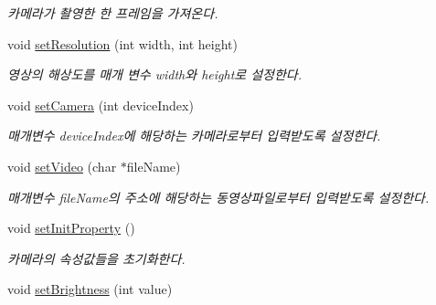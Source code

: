 \begin{DoxyCompactItemize}
\begin{DoxyCompactList}\small\item\em 카메라가 촬영한 한 프레임을 가져온다. \end{DoxyCompactList}\item 
\hypertarget{class_fk_camera_a10bba67c6f4c2d9d9fd75c1977732f93}{}void \hyperlink{class_fk_camera_a10bba67c6f4c2d9d9fd75c1977732f93}{set\+Resolution} (int width, int height)\label{class_fk_camera_a10bba67c6f4c2d9d9fd75c1977732f93}

\begin{DoxyCompactList}\small\item\em 영상의 해상도를 매개 변수 width와 height로 설정한다. \end{DoxyCompactList}\item 
\hypertarget{class_fk_camera_abca0564ec0ab97fe6b34fd76973031cf}{}void \hyperlink{class_fk_camera_abca0564ec0ab97fe6b34fd76973031cf}{set\+Camera} (int device\+Index)\label{class_fk_camera_abca0564ec0ab97fe6b34fd76973031cf}

\begin{DoxyCompactList}\small\item\em 매개변수 device\+Index에 해당하는 카메라로부터 입력받도록 설정한다. \end{DoxyCompactList}\item 
\hypertarget{class_fk_camera_ab1b250db342edba63b7a59d0ab337f99}{}void \hyperlink{class_fk_camera_ab1b250db342edba63b7a59d0ab337f99}{set\+Video} (char $\ast$file\+Name)\label{class_fk_camera_ab1b250db342edba63b7a59d0ab337f99}

\begin{DoxyCompactList}\small\item\em 매개변수 file\+Name의 주소에 해당하는 동영상파일로부터 입력받도록 설정한다. \end{DoxyCompactList}\item 
\hypertarget{class_fk_camera_aeeb2148840a01b7ca8c5028a7327cc13}{}void \hyperlink{class_fk_camera_aeeb2148840a01b7ca8c5028a7327cc13}{set\+Init\+Property} ()\label{class_fk_camera_aeeb2148840a01b7ca8c5028a7327cc13}

\begin{DoxyCompactList}\small\item\em 카메라의 속성값들을 초기화한다. \end{DoxyCompactList}\item 
\hypertarget{class_fk_camera_acb2d6a889d03eb5f47687250d92b016b}{}void \hyperlink{class_fk_camera_acb2d6a889d03eb5f47687250d92b016b}{set\+Brightness} (int value)\label{class_fk_camera_acb2d6a889d03eb5f47687250d92b016b}


\end{DoxyCompactItemize}
